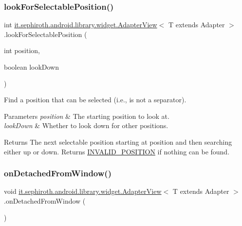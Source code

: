 \subsubsection{\texorpdfstring{look\+For\+Selectable\+Position()}{lookForSelectablePosition()}}
{\footnotesize\ttfamily int \hyperlink{classit_1_1sephiroth_1_1android_1_1library_1_1widget_1_1_adapter_view}{it.\+sephiroth.\+android.\+library.\+widget.\+Adapter\+View}$<$ T extends Adapter $>$.look\+For\+Selectable\+Position (\begin{DoxyParamCaption}\item[{int}]{position,  }\item[{boolean}]{look\+Down }\end{DoxyParamCaption})\hspace{0.3cm}{\ttfamily [protected]}}

Find a position that can be selected (i.\+e., is not a separator).


\begin{DoxyParams}{Parameters}
{\em position} & The starting position to look at. \\
\hline
{\em look\+Down} & Whether to look down for other positions. \\
\hline
\end{DoxyParams}
\begin{DoxyReturn}{Returns}
The next selectable position starting at position and then searching either up or down. Returns \hyperlink{classit_1_1sephiroth_1_1android_1_1library_1_1widget_1_1_adapter_view_a2751b7d592638baeaf149f6da0d4e598}{I\+N\+V\+A\+L\+I\+D\+\_\+\+P\+O\+S\+I\+T\+I\+ON} if nothing can be found. 
\end{DoxyReturn}
\mbox{\label{classit_1_1sephiroth_1_1android_1_1library_1_1widget_1_1_adapter_view_a3fa18bf56943a40d22a6fb8fb29f6456}} 
\subsubsection{\texorpdfstring{on\+Detached\+From\+Window()}{onDetachedFromWindow()}}
{\footnotesize\ttfamily void \hyperlink{classit_1_1sephiroth_1_1android_1_1library_1_1widget_1_1_adapter_view}{it.\+sephiroth.\+android.\+library.\+widget.\+Adapter\+View}$<$ T extends Adapter $>$.on\+Detached\+From\+Window (\begin{DoxyParamCaption}{ }\end{DoxyParamCaption})\hspace{0.3cm}{\ttfamily [protected]}}

